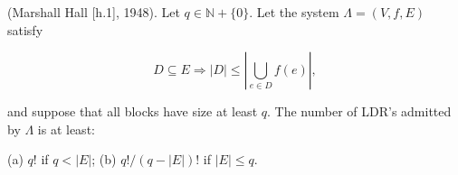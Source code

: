 (Marshall Hall [h.1], 1948). Let $q \in \mathbb{N} + \{0\}$. Let the system $\Lambda = (V, f, E)$ satisfy

$$D \subseteq E \Rightarrow |D| \leq \left| \bigcup_{e \in D} f(e) \right|,$$

and suppose that all blocks have size at least $q$. The number of LDR’s admitted by $\Lambda$ is at least:

(a) $q!$ if $q < |E|$;
(b) $q! / (q - |E|)!$ if $|E| \leq q$.
